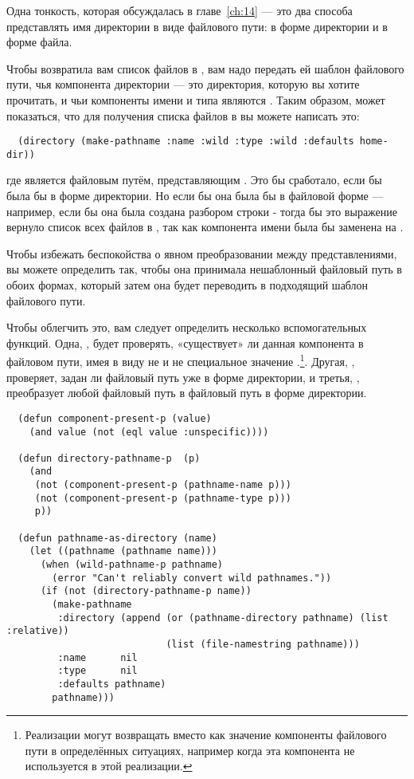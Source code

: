 Одна тонкость, которая обсуждалась в главе~\ref{ch:14} --- это два способа представлять
имя директории в виде файлового пути: в форме директории и в форме файла.

Чтобы  возвратила вам список файлов в , вам надо
передать ей шаблон файлового пути, чья компонента директории --- это директория, которую
вы хотите прочитать, и чьи компоненты имени и типа являются . Таким образом,
может показаться, что для получения списка файлов в  вы можете написать
это:

\begin{lstlisting}
  (directory (make-pathname :name :wild :type :wild :defaults home-dir))
\end{lstlisting}

где  является файловым путём, представляющим . Это бы
сработало, если бы  была бы в форме директории. Но если бы она была бы в
файловой форме --- например, если бы она была создана разбором строки 
- тогда бы это выражение вернуло список всех файлов в , так как компонента
имени  была бы заменена на .

Чтобы избежать беспокойства о явном преобразовании между представлениями, вы можете
определить  так, чтобы она принимала нешаблонный файловый путь в
обоих формах, который затем она будет переводить в подходящий шаблон файлового пути.

Чтобы облегчить это, вам следует определить несколько вспомогательных функций. Одна,
, будет проверять, «существует» ли данная компонента в файловом
пути, имея в виду не  и не специальное значение
.\footnote{Реализации могут возвращать  вместо
   как значение компоненты файлового пути в определённых ситуациях, например
  когда эта компонента не используется в этой реализации.}. Другая,
, проверяет, задан ли файловый путь уже в форме директории, и
третья, , преобразует любой файловый путь в файловый путь в
форме директории.

\begin{lstlisting}
  (defun component-present-p (value)
    (and value (not (eql value :unspecific))))

  (defun directory-pathname-p  (p)
    (and
     (not (component-present-p (pathname-name p)))
     (not (component-present-p (pathname-type p)))
     p))

  (defun pathname-as-directory (name)
    (let ((pathname (pathname name)))
      (when (wild-pathname-p pathname)
        (error "Can't reliably convert wild pathnames."))
      (if (not (directory-pathname-p name))
        (make-pathname
         :directory (append (or (pathname-directory pathname) (list :relative))
                            (list (file-namestring pathname)))
         :name      nil
         :type      nil
         :defaults pathname)
        pathname)))
\end{lstlisting}


